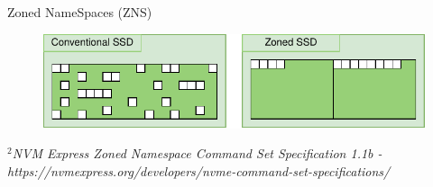 \documentclass{beamer}
\begin{document}
\begin{frame}{Zoned NameSpaces (ZNS)}
	\begingroup
	\small
	\begin{figure}
		\centering
		\includegraphics[width=1\textwidth]{resources/images/zns-vs-conventional-layout.pdf}
	\end{figure}
	\textit{\tiny $^{2}$NVM Express Zoned Namespace Command Set Specification 1.1b - 
	https://nvmexpress.org/developers/nvme-command-set-specifications/}
	\endgroup
\end{frame}
\end{document}
